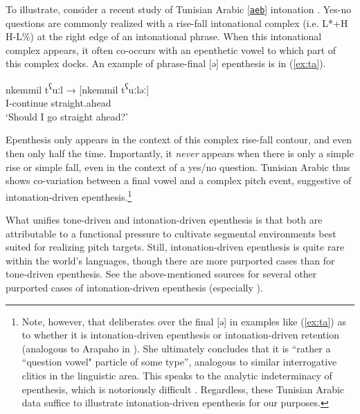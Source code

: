 \documentclass[output=paper,colorlinks,citecolor=brown,draft,draftmode]{langscibook}
\begin{document}
To illustrate, consider a recent study of Tunisian Arabic  
[\href{https://glottolog.org/resource/languoid/id/tuni1259}{\texttt{aeb}}]
intonation \citep{hellmuth2022}.
Yes-no questions are commonly realized with a rise-fall intonational complex (i.e. L*+H H-L\%) at the right edge of an intonational phrase. 
When this intonational complex appears, it often co-occurs with an epenthetic vowel to which part of this complex docks.
An example of phrase-final [ə] epenthesis is in (\ref{ex:ta}).

\ea \label{ex:ta}
\gll 
nkemmil t\textsuperscript{ʕ}uːl → {} {} {} {} {} {} {} {[nkemmil t\textsuperscript{ʕ}uːləː]}\\
I-continue straight.ahead\\
\glt `Should I go straight ahead?' \citep{hellmuth2022}
\z
{}

\noindent
Epenthesis only appears in the context of this complex rise-fall contour, and even then only  half the time. 
Importantly, it \emph{never} appears when there is only a simple rise or simple fall, even in the context of a yes/no question. 
Tunisian Arabic thus shows co-variation between a final vowel and a complex pitch event, suggestive of intonation-driven epenthesis.\footnote{Note, however, that \citet{hellmuth2022} deliberates over the final [ə] in examples like (\ref{ex:ta}) as to whether it is intonation-driven epenthesis or intonation-driven retention (analogous to Arapaho  in ).
She ultimately concludes that it is ``rather a ``question vowel" particle of some type'', analogous to similar interrogative clitics in the linguistic area. 
This speaks to the analytic indeterminacy of epenthesis, which is notoriously difficult \citep{morley_deletion_2015}.
Regardless, these Tunisian Arabic data suffice to illustrate intonation-driven epenthesis for our purposes.}





What unifies tone-driven and intonation-driven epenthesis is that both are attributable to a functional pressure to cultivate segmental environments best suited for realizing pitch targets.
Still, intonation-driven epenthesis is quite rare within the world's languages, though there are more purported cases than for tone-driven epenthesis.
See the above-mentioned sources for several other purported cases of intonation-driven epenthesis (especially \citealt{roettger2019}).
\end{document}
